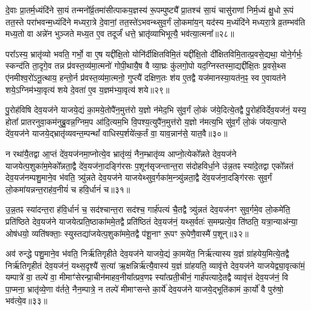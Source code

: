दे॒वाः प्रा॒तर्म॒ध्यंदि॑ने सा॒यं तन्मनो᳚र्व्र॒तमा॑सीत्पाकय॒ज्ञस्य॑ रू॒पम्पुष्ट्यै᳚ प्रा॒तश्च॑ सा॒यं चासु॑राणां निर्म॒ध्यं क्षु॒धो रू॒पं तत॒स्ते परा॑भवन्म॒ध्यंदि॑ने मध्यरा॒त्रे दे॒वानां॒ तत॒स्ते॑\-ऽभवन्थ्सुव॒र्गं लो॒कमा॑य॒न् यद॑स्य म॒ध्यंदि॑ने मध्यरा॒त्रे व्र॒तम्भव॑ति मध्य॒तो वा अन्ने॑न भुञ्जते मध्य॒त ए॒व तदूर्जं॑ धत्ते॒ भ्रातृ॑व्याभिभूत्यै॒ भव॑त्या॒त्मना᳚॥२८॥

परा᳚\-ऽस्य॒ भ्रातृ॑व्यो भवति॒ गर्भो॒ वा ए॒ष यद्दी᳚क्षि॒तो योनि॑र्दीक्षितविमि॒तं यद्दी᳚क्षि॒तो दी᳚क्षितविमि॒तात्प्र॒वसे॒द्यथा॒ योने॒र्गर्भः॒ स्कन्द॑ति ता॒दृगे॒व तन्न प्र॑वस्त॒व्य॑मा॒त्मनो॑ गोपी॒थायै॒ष वै व्या॒घ्रः कु॑लगो॒पो यद॒ग्निस्तस्मा॒द्यद्दी᳚क्षि॒तः प्र॒वसे॒थ्स ए॑नमीश्व॒रो॑\-ऽनू॒त्थाय॒ हन्तो॒र्न प्र॑वस्त॒व्य॑मा॒त्मनो॒ गुप्त्यै॑ दक्षिण॒तः श॑य ए॒तद्वै यज॑मानस्या॒यत॑न॒ꣴ॒ स्व ए॒वायत॑ने शये॒\-ऽग्निम॑भ्या॒वृत्य॑ शये दे॒वता॑ ए॒व य॒ज्ञम॑भ्या॒वृत्य॑ शये॥२९॥

{\anuvakamend[{ए॒तद्वै क्रू॒र इ॒वैक॑व्रता आ॒त्मना॒ यज॑मानस्य॒ त्रयो॑दश च॥५॥}]}

पु॒रोह॑विषि देव॒यज॑ने याजये॒द्यं का॒मये॒तोपै॑न॒मुत्त॑रो य॒ज्ञो न॑मेद॒भि सु॑व॒र्गं लो॒कं ज॑ये॒दित्ये॒तद्वै पु॒रोह॑विर्देव॒यज॑नं॒ यस्य॒ होता᳚ प्रातरनुवा॒कम॑नुब्रु॒वन्न॒ग्निम॒प आ॑दि॒त्यम॒भि वि॒पश्य॒त्युपै॑न॒मुत्त॑रो य॒ज्ञो न॑मत्य॒भि सु॑व॒र्गं लो॒कं ज॑यत्या॒प्ते दे॑व॒यज॑ने याजये॒द्भ्रातृ॑व्यवन्त॒म्पन्थां᳚ वाधिस्प॒र्\mbox{}शये॑त्क॒र्तं वा॒ याव॒न्नान॑से॒ यात॒वै॥३०॥

न रथा॑यै॒तद्वा आ॒प्तं दे॑व॒यज॑नमा॒प्नोत्ये॒व भ्रातृ॑व्यं॒ नैन॒म्भ्रातृ॑व्य आप्नो॒त्येको᳚न्नते देव॒यज॑ने याजयेत्प॒शुका॑म॒मेको᳚न्नता॒द्वै दे॑व॒यज॑ना॒दङ्गि॑रसः प॒शून॑सृजन्तान्त॒रा स॑दोहविर्धा॒ने उ॑न्न॒तꣴ स्या॑दे॒तद्वा एको᳚न्नतं देव॒यज॑नम्पशु॒माने॒व भ॑वति॒ त्र्यु॑न्नते देव॒यज॑ने याजयेथ्सुव॒र्गका॑म॒न्त्र्यु॑न्नता॒द्वै दे॑व॒यज॑ना॒दङ्गि॑रसः सुव॒र्गं लो॒कमा॑यन्नन्त॒राह॑व॒नीयं॑ च हवि॒र्धानं॑ च॥३१॥

उ॒न्न॒तꣴ स्या॑दन्त॒रा ह॑वि॒र्धानं॑ च॒ सद॑श्चान्त॒रा सद॑श्च॒ गार्\mbox{}ह॑पत्यं चै॒तद्वै त्र्यु॑न्नतं देव॒यज॑नꣳ सुव॒र्गमे॒व लो॒कमे॑ति॒ प्रति॑ष्ठिते देव॒यज॑ने याजयेत्प्रति॒ष्ठाका॑ममे॒तद्वै प्रति॑ष्ठितं देव॒यज॑नं॒ यथ्स॒र्वतः॑ स॒मम्प्रत्ये॒व ति॑ष्ठति॒ यत्रा॒न्याअ॑न्या॒ ओष॑धयो॒ व्यति॑षक्ताः॒ स्युस्तद्या॑जयेत्प॒शुका॑ममे॒तद्वै प॑शू॒नाꣳ रू॒पꣳ रू॒पेणै॒वास्मै॑ प॒शून्॥३२॥

अव॑ रुन्द्धे पशु॒माने॒व भ॑वति॒ निर्\mbox{}ऋ॑तिगृहीते देव॒यज॑ने याजये॒द्यं का॒मये॑त॒ निर्\mbox{}ऋ॑त्यास्य य॒ज्ञं ग्रा॑हयेय॒मित्ये॒तद्वै निर्\mbox{}ऋ॑तिगृहीतं देव॒यज॑नं॒ यथ्स॒दृश्यै॑ स॒त्या॑ ऋ॒क्षन्निर्\mbox{}ऋ॑त्यै॒वास्य॑ य॒ज्ञं ग्रा॑हयति॒ व्यावृ॑त्ते देव॒यज॑ने याजयेद्व्या॒वृत्का॑मं॒ यम्पात्रे॑ वा॒ तल्पे॑ वा॒ मीमाꣳ॑सेरन्प्रा॒चीन॑माहव॒नीया᳚त्प्रव॒णꣴ स्या᳚त्प्रती॒चीनं॒ गार्\mbox{}ह॑पत्यादे॒तद्वै व्यावृ॑त्तं देव॒यज॑नं॒ वि पा॒प्मना॒ भ्रातृ॑व्ये॒णा व॑र्तते॒ नैन॒म्पात्रे॒ न तल्पे॑ मीमाꣳसन्ते का॒र्ये॑ देव॒यज॑ने याजये॒द्भूति॑कामं का॒र्यो॑ वै पुरु॑षो॒ भव॑त्ये॒व॥३३॥

